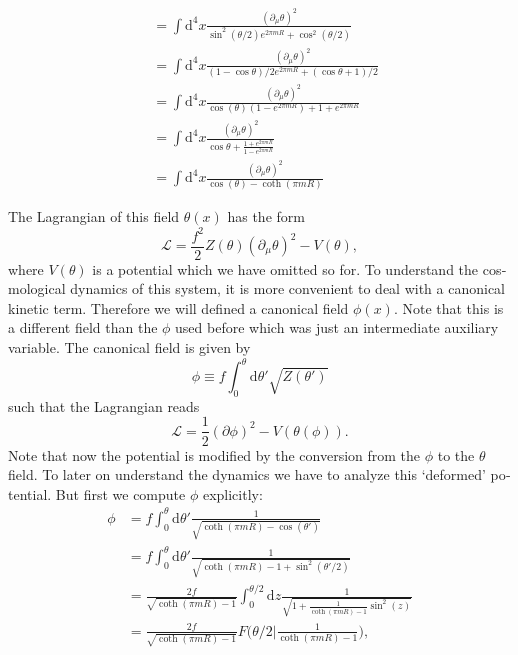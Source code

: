 \documentclass[master,       %
               twoside,        %
               BCOR10mm,       %
               english,ngerman, %
               ]{GAUBM}
\begin{document}
\begin{otherlanguage}{english}
\begin{align}
	 &= \int \mathrm{d}^4 x \frac{(\partial_\mu \theta)^2}{\sin^2(\theta / 2) e^{2\pi m R} + \cos^2(\theta / 2)} \nonumber \\
	 &= \int \mathrm{d}^4 x \frac{(\partial_\mu \theta)^2}{(1 - \cos \theta) / 2 e^{2\pi m R} + (\cos \theta + 1) / 2} \nonumber \\
	 &= \int \mathrm{d}^4 x \frac{(\partial_\mu \theta)^2}{\cos(\theta)(1 - e^{2\pi mR}) + 1 + e^{2\pi mR}} \nonumber \\
	 &= \int \mathrm{d}^4 x \frac{(\partial_\mu \theta)^2}{\cos \theta + \frac{1 + e^{2\pi mR}}{1 - e^{2\pi mR}}} \nonumber \\
	 &= \int \mathrm{d}^4 x \frac{(\partial_\mu \theta)^2}{\cos(\theta) - \coth(\pi mR)}
\end{align}

The Lagrangian of this field $\theta(x)$ has the form
\begin{equation}
	\mathcal{L} = \frac{f^2}{2} Z(\theta) (\partial_\mu \theta)^2 - V(\theta),
\end{equation}
where $V(\theta)$ is a potential which we have omitted so for.
To understand the cosmological dynamics of this system, it is more convenient to deal with a canonical kinetic term. Therefore we will defined a canonical field $\phi(x)$. Note that this is a different field than the $\phi$ used before which was just an intermediate auxiliary variable.
The canonical field is given by
\begin{equation}
	\phi \equiv f \int_0^\theta \mathrm{d} \theta' \sqrt{Z(\theta')}
\end{equation}
such that the Lagrangian reads
\begin{equation}
	\mathcal{L} = \frac{1}{2} (\partial \phi)^2 - V(\theta(\phi)).
\end{equation}
Note that now the potential is modified by the conversion from the $\phi$ to the $\theta$ field. To later on understand the dynamics we have to analyze this `deformed' potential.
But first we compute $\phi$ explicitly:
\begin{align}
	\phi &= f \int_0^\theta \mathrm{d} \theta' \frac{1}{\sqrt{\coth(\pi mR) - \cos(\theta')}} \nonumber \\
	&= f \int_0^\theta \mathrm{d} \theta' \frac{1}{\sqrt{\coth(\pi mR) - 1 + \sin^2(\theta'/2)}} \nonumber \\
	&= \frac{2 f}{\sqrt{\coth(\pi mR) - 1}} \int_0^{\theta/2} \mathrm{d} z \frac{1}{\sqrt{1 + \frac{1}{\coth(\pi mR) - 1} \sin^2(z)}} \nonumber \\
	&= \frac{2 f}{\sqrt{\coth(\pi mR) - 1}} F\big(\theta / 2 \big| \frac{1}{\coth(\pi mR) - 1}\big),

\end{align}
\end{otherlanguage}
\end{document}
